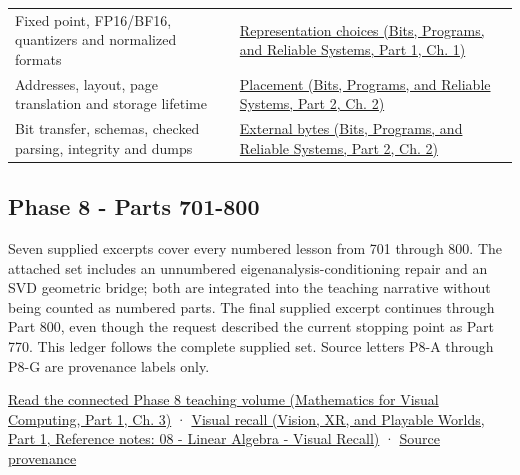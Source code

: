 {\begin{longtable}[]{@{}
  >{\raggedright\arraybackslash}p{}
  >{\raggedright\arraybackslash}p{}@{}}
Fixed point, FP16/BF16, quantizers and normalized formats & \href{../01-Bits-Programs-and-Reliable-Systems-P01/main.pdf\#01-foundations-i-ch001-choosing-what-information-to-keep}{Representation choices (Bits, Programs, and Reliable Systems, Part 1, Ch. 1)} \\
Addresses, layout, page translation and storage lifetime & \href{../01-Bits-Programs-and-Reliable-Systems-P02/main.pdf\#01-foundations-i-ch002-where-the-bytes-live}{Placement (Bits, Programs, and Reliable Systems, Part 2, Ch. 2)} \\
Bit transfer, schemas, checked parsing, integrity and dumps & \href{../01-Bits-Programs-and-Reliable-Systems-P02/main.pdf\#01-foundations-i-ch002-bytes-become-a-durable-agreement}{External bytes (Bits, Programs, and Reliable Systems, Part 2, Ch. 2)} \\
\end{longtable}
}

\subsection{Phase 8 - Parts 701-800}\label{appendix-fd090d982a15-phase-8---parts-701-800}

\hypertarget{appendix-fd090d982a15-phase-8---parts-701-800}{}

Seven supplied excerpts cover every numbered lesson from 701 through 800. The attached set includes an unnumbered eigenanalysis-conditioning repair and an SVD geometric bridge; both are integrated into the teaching narrative without being counted as numbered parts. The final supplied excerpt continues through Part 800, even though the request described the current stopping point as Part 770. This ledger follows the complete supplied set. Source letters P8-A through P8-G are provenance labels only.

\href{../02-Mathematics-for-Visual-Computing-P01/main.pdf\#01-foundations-i-ch019-the-graphics-problem-hiding-inside-a-matrix-equation}{Read the connected Phase 8 teaching volume (Mathematics for Visual Computing, Part 1, Ch. 3)} · \href{../07-Vision-XR-and-Playable-Worlds-P01/main.pdf\#appendix-932cf7182ff1}{Visual recall (Vision, XR, and Playable Worlds, Part 1, Reference notes: 08 - Linear Algebra - Visual Recall)} · \hyperref[appendix-a103e7846d21-phase-8---source-analysis-and-verification]{Source provenance}

